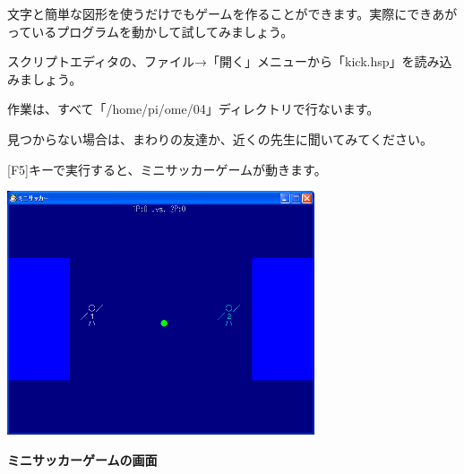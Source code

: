 \documentclass[a4paper,dvipdfmx]{jarticle}
\begin{document}
\bigskip

文字と簡単な図形を使うだけでもゲームを作ることができます。実際にできあがっているプログラムを動かして試してみましょう。

スクリプトエディタの、ファイル→「開く」メニューから「kick.hsp」を読み込みましょう。

作業は、すべて「/home/pi/ome/04」ディレクトリで行ないます。

見つからない場合は、まわりの友達か、近くの先生に聞いてみてください。


\bigskip

[F5]キーで実行すると、ミニサッカーゲームが動きます。


\bigskip



\begin{center}
\includegraphics[width=9.075cm,height=7.197cm]{text04-img/text04-img005.png}

\end{center}

\bigskip


\bigskip


\bigskip


\bigskip


\bigskip


\bigskip


\bigskip


\bigskip


\bigskip


\bigskip


\bigskip


\bigskip


\bigskip


\bigskip

{\bfseries
ミニサッカーゲームの画面}


\bigskip
\end{document}
